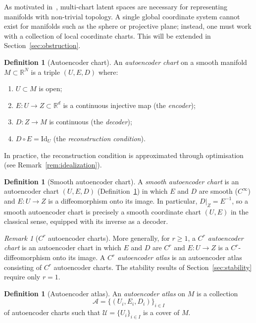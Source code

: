 \documentclass[11pt]{article}
\newcommand{\R}{\mathbb{R}}
\theoremstyle{plain}
\theoremstyle{definition}
\newtheorem{definition}[theorem]{Definition}
\theoremstyle{remark}
\newtheorem{remark}[theorem]{Remark}
\begin{document}
As motivated in~\cite{schonsheck2020chartautoencodersmanifoldstructured}, multi-chart latent spaces are necessary for representing manifolds with non-trivial topology. A single global coordinate system cannot exist for manifolds such as the sphere or projective plane; instead, one must work with a collection of local coordinate charts. This will be extended in Section~\ref{sec:obstruction}.

\begin{definition}[Autoencoder chart]\label{def:autoencoder-chart}
An \emph{autoencoder chart} on a smooth manifold $M \subset \R^N$ is a triple $(U, E, D)$ where:
\begin{enumerate}
\item $U \subset M$ is open;
\item $E \colon U \to Z \subset \R^d$ is a continuous injective map (the \emph{encoder});
\item $D \colon Z \to M$ is continuous (the \emph{decoder});
\item $D \circ E = \mathrm{Id}_{U}$ (the \emph{reconstruction condition}).
\end{enumerate}
\end{definition}

In practice, the reconstruction condition is approximated through optimisation (see Remark~\ref{rem:idealization}).

\begin{definition}[Smooth autoencoder chart]\label{def:smooth-chart}
A \emph{smooth autoencoder chart} is an autoencoder chart $(U, E, D)$ (Definition~\ref{def:autoencoder-chart}) in which $E$ and $D$ are smooth ($C^\infty$) and $E \colon U \to Z$ is a diffeomorphism onto its image. In particular, $D|_Z = E^{-1}$, so a smooth autoencoder chart is precisely a smooth coordinate chart $(U, E)$ in the classical sense, equipped with its inverse as a decoder.
\end{definition}

\begin{remark}[$C^r$ autoencoder charts]\label{rem:Cr-chart}
More generally, for $r \geq 1$, a \emph{$C^r$ autoencoder chart} is an autoencoder chart in which $E$ and $D$ are $C^r$ and $E \colon U \to Z$ is a $C^r$-diffeomorphism onto its image. A \emph{$C^r$ autoencoder atlas} is an autoencoder atlas consisting of $C^r$ autoencoder charts. The stability results of Section~\ref{sec:stability} require only $r = 1$.
\end{remark}

\begin{definition}[Autoencoder atlas]\label{def:autoencoder-atlas}
An \emph{autoencoder atlas} on $M$ is a collection
\[
\mathcal{A} = \{(U_i, E_i, D_i)\}_{i \in I}
\]
of autoencoder charts such that $\mathcal{U} = \{U_i\}_{i \in I}$ is a cover of $M$.
\end{definition}
\end{document}
